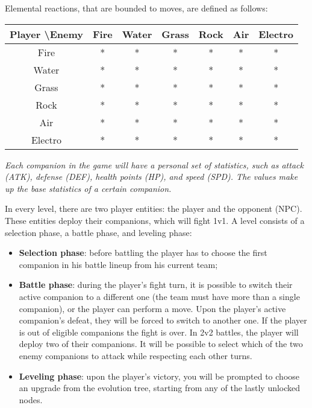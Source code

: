 \documentclass[12pt, a4paper]{report}
\begin{document}
    Elemental reactions, that are bounded to moves, are defined as follows:
\begin{center}
    \begin{tabular}{| c || c | c | c | c | c | c |}
        \hline
        Player \textbackslash Enemy & Fire & Water & Grass & Rock & Air & Electro \\ [0.5ex]
        \hline\hline
        Fire & * & * & * & * & * & * \\
        \hline
        Water & * & * & * & * & * & * \\
        \hline
        Grass & * & * & * & * & * & * \\
        \hline
        Rock & * & * & * & * & * & * \\
        \hline
        Air & * & * & * & * & * & * \\
        \hline
        Electro & * & * & * & * & * & * \\
        \hline
    \end{tabular}
\end{center}

    \textit{Each companion in the game will have a personal set of statistics, such as attack (ATK), defense (DEF), health points (HP), and speed (SPD).
    The values make up the base statistics of a certain companion.}

    In every level, there are two player entities: the player and the opponent (NPC). These entities deploy their companions, which will fight 1v1.
    A level consists of a selection phase, a battle phase, and leveling phase:
\begin{itemize}
    \item \textbf{Selection phase}: before battling the player has to choose the first companion in his battle lineup from his current team;
    \item \textbf{Battle phase}: during the player's fight turn, it is possible to switch their active companion to a different one (the team must have more than a single companion), 
        or the player can perform a move. Upon the player's active companion's defeat, they will be forced to switch to another one. 
        If the player is out of eligible companions the fight is over. In 2v2 battles, the player will deploy two of their companions. 
        It will be possible to select which of the two enemy companions to attack while respecting each other turns.
    \item \textbf{Leveling phase}: upon the player's victory, you will be prompted to choose an upgrade from the evolution tree, starting from any of the lastly unlocked nodes.
\end{itemize}
\end{document}
